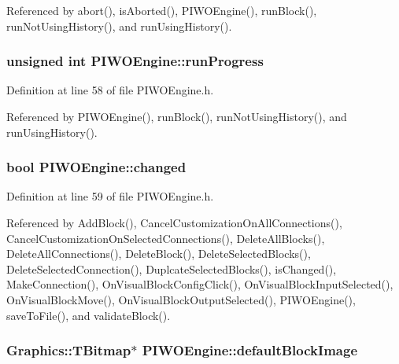 Referenced by abort(), isAborted(), PIWOEngine(), runBlock(), runNotUsingHistory(), and runUsingHistory().\hypertarget{classPIWOEngine_84d4db25d471839e7cdd44ae0eb2b517}{
\subsubsection[runProgress]{\setlength{\rightskip}{0pt plus 5cm}unsigned int {\bf PIWOEngine::runProgress}}}
\label{classPIWOEngine_84d4db25d471839e7cdd44ae0eb2b517}




Definition at line 58 of file PIWOEngine.h.

Referenced by PIWOEngine(), runBlock(), runNotUsingHistory(), and runUsingHistory().\hypertarget{classPIWOEngine_3d5702db522458d8de52d3dbd0203cdc}{
\subsubsection[changed]{\setlength{\rightskip}{0pt plus 5cm}bool {\bf PIWOEngine::changed}}}
\label{classPIWOEngine_3d5702db522458d8de52d3dbd0203cdc}




Definition at line 59 of file PIWOEngine.h.

Referenced by AddBlock(), CancelCustomizationOnAllConnections(), CancelCustomizationOnSelectedConnections(), DeleteAllBlocks(), DeleteAllConnections(), DeleteBlock(), DeleteSelectedBlocks(), DeleteSelectedConnection(), DuplcateSelectedBlocks(), isChanged(), MakeConnection(), OnVisualBlockConfigClick(), OnVisualBlockInputSelected(), OnVisualBlockMove(), OnVisualBlockOutputSelected(), PIWOEngine(), saveToFile(), and validateBlock().\hypertarget{classPIWOEngine_23d5dbc92608ee42ba7975d2454ecbcf}{
\subsubsection[defaultBlockImage]{\setlength{\rightskip}{0pt plus 5cm}Graphics::TBitmap$\ast$ {\bf PIWOEngine::defaultBlockImage}}}
\label{classPIWOEngine_23d5dbc92608ee42ba7975d2454ecbcf}


